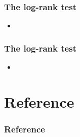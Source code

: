 \documentclass[10pt]{beamer}\usepackage[]{graphicx}\usepackage[]{color}
\begin{document}
\begin{frame}
  \frametitle{The log-rank test}
  \begin{itemize}
  \item
  \end{itemize}
\end{frame}

\begin{frame}
  \frametitle{The log-rank test}
  \begin{itemize}
  \item
  \end{itemize}
\end{frame}


\section{Reference}
\begin{frame}[shrink = 25]
\frametitle{Reference}
\begin{center}
\scriptsize


\end{center}
\end{frame}
\end{document}
